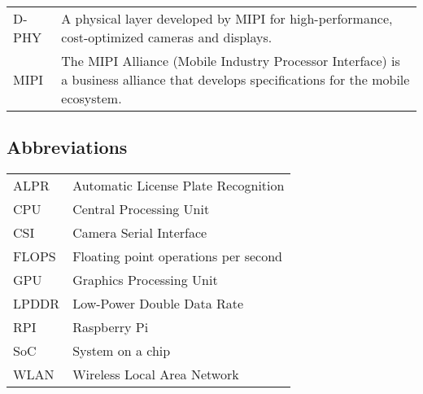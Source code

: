 \begin{tabularx}{\textwidth}{p{2.5cm}X}
    D-PHY & A physical layer developed by MIPI for high-performance, cost-optimized cameras and displays.\\
    MIPI  & The MIPI Alliance (Mobile Industry Processor Interface) is a business alliance that develops specifications for the mobile ecosystem.\\
\end{tabularx}

\subsection{Abbreviations}
\begin{tabularx}{\textwidth}{lX}
    ALPR  & Automatic License Plate Recognition\\
    CPU   & Central Processing Unit\\
    CSI   & Camera Serial Interface\\
    FLOPS & Floating point operations per second\\
    GPU   & Graphics Processing Unit\\
    LPDDR & Low-Power Double Data Rate\\
    RPI   & Raspberry Pi\\
    SoC   & System on a chip\\
    WLAN  & Wireless Local Area Network\\
\end{tabularx}
